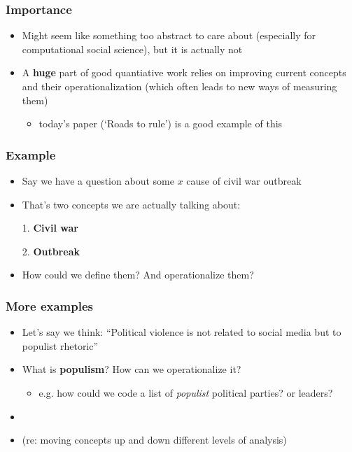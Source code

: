 \documentclass[aspectratio=43]{beamer}
\begin{document}
\begin{frame}
\frametitle{Importance}
\centering

\begin{itemize}
  \item Might seem like something too abstract to care about (especially for computational social science), but it is actually not
  \item<2-> A \textbf{huge} part of good quantiative work relies on improving current concepts and their operationalization (which often leads to new ways of measuring them)
  \begin{itemize}
    \item today's paper (`Roads to rule') is a good example of this
  \end{itemize}
\end{itemize}

\end{frame}

\begin{frame}
\frametitle{Example}
\centering

\begin{itemize}
  \item Say we have a question about some $x$ cause of civil war outbreak
  \item That's two concepts we are actually talking about:
  \item[1.] \textbf{Civil war}
  \item[2.] \textbf{Outbreak}
  \item How could we define them? And operationalize them?
\end{itemize}

\end{frame}

\begin{frame}
\frametitle{More examples}
\centering

\begin{itemize}
  \item Let's say we think: ``Political violence is not related to social media but to populist rhetoric''
  \item<2-> What is \textbf{populism}? How can we operationalize it?
  \begin{itemize}
    \item e.g. how could we code a list of \textit{populist} political parties? or leaders?
  \end{itemize}
  \item<2->[]
  \item<2->[] (re: moving concepts up and down different levels of analysis)
\end{itemize}

\end{frame}
\end{document}
